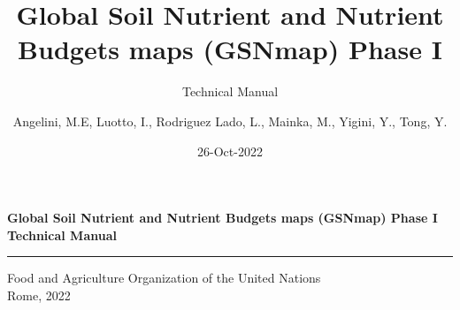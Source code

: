 \documentclass[
  10pt,
  b5paper,
  oneside]{book}
\title{
Global Soil Nutrient and Nutrient Budgets maps (GSNmap) Phase I}
\subtitle{Technical Manual}
\author{Angelini, M.E, Luotto, I., Rodriguez Lado, L., Mainka, M., Yigini, Y., Tong, Y.}
\date{26-Oct-2022}
\newcommand\blankpage{%
    \null
    \thispagestyle{empty}%
    \addtocounter{page}{-1}%
    \newpage}
\begin{document}
\maketitle

\pagestyle{plain}

\afterpage{\blankpage}
\thispagestyle{empty}
\begin{titlepage}
    \begin{center}
        \vspace*{4cm}
        \Large

        \textcolor{astral}{\textbf{Global Soil Nutrient and Nutrient Budgets maps (GSNmap) Phase I\\
Technical Manual\\}}
        \vspace{0.5cm}
        \normalsize
        \vfill
        \noindent
        {\color{astral}\rule{\linewidth}{0.5mm} }

        Food and Agriculture Organization of the United Nations\\
	Rome, 2022
    \end{center}
\end{titlepage}



\frontmatter
{}   
\tableofcontents
\listoffigures
\listoftables
\nopagebreak[5]
\lstset{breaklines=true}
\end{document}
